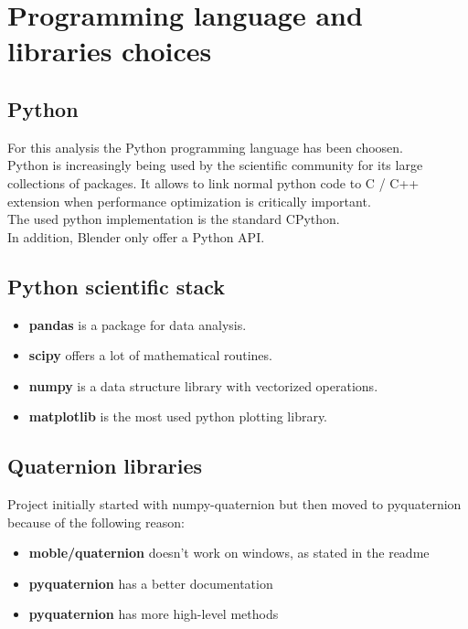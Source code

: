 \chapter{Programming language and libraries choices}
\label{chap:programming_language_libraries_choices}

\section{Python}
For this analysis the Python programming language \cite{python-website} has been choosen. \\
Python is increasingly being used by the scientific community for its large collections of packages. It allows to link normal python code to C / C++ extension when performance optimization is critically important. \\
The used python implementation is the standard CPython. \\
In addition, Blender only offer a Python API.

\section{Python scientific stack}
\begin{itemize}
	\item \textbf{pandas} is a package for data analysis.
	\item \textbf{scipy} offers a lot of mathematical routines.
	\item \textbf{numpy} is a data structure library with vectorized operations. %
	\item \textbf{matplotlib} is the most used python plotting library.
\end{itemize}

\section{Quaternion libraries}

Project initially started with numpy-quaternion \cite{numpy-quaternion} but then moved to pyquaternion \cite{pyquaternion} because of the following reason:
\begin{itemize}
\item \textbf{moble/quaternion} doesn't work on windows, as stated in the readme
\item \textbf{pyquaternion} has a better documentation
\item \textbf{pyquaternion} has more high-level methods
\end{itemize}

